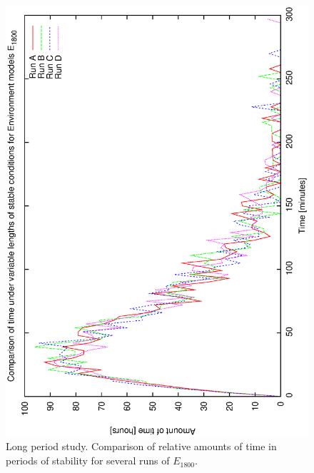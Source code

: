 \begin{figure}[h]
\begin{center}
 \includegraphics[scale=0.5, angle=-90]{figures/e_18_comp.eps}
 \caption[Environmental scenario - comparison between runs of $E_{1800}$] 
   {Long period study. Comparison of relative amounts of time in periods of stability for several runs of $E_{1800}$.}
\end{center} 
\label{fig:env_comp_18}
\end{figure}

